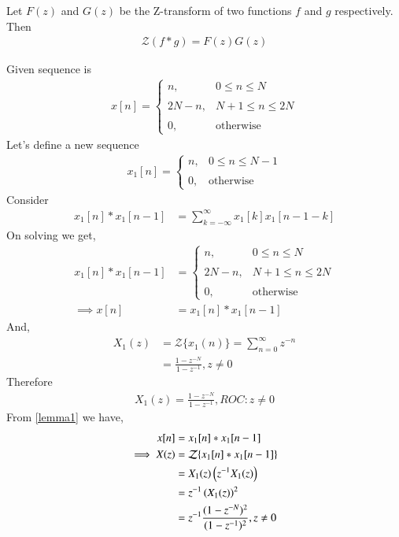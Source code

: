 \documentclass[journal,12pt,twocolumn]{IEEEtran}
\begin{document}
\begin{theorem} \label{ct}
Let $F(z)$ and $G(z)$ be the Z-transform of two functions $f$ and $g$ respectively. Then
\begin{align}
\mathcal{Z}(f * g)=F(z)G(z)
\end{align}
\end{theorem}
Given sequence is
\begin{align}
   x[n] = \begin{cases}
         n, & 0 \leq n \leq N \\~\\[-1em]
	     2N-n, & N+1 \leq n \leq 2N \\~\\[-1em]
	     0, & \text{otherwise}
         \end{cases}
\end{align}
%
Let's define a new sequence 
\begin{align}
    x_1[n] = \begin{cases}
         n, & 0 \leq n \leq N-1 \\~\\[-1em]
	     0, & \text{otherwise}
         \end{cases}
\end{align}
Consider
\begin{align}
    x_1[n]*x_1[n-1]
    &= \sum_{k = -\infty}^{\infty} x_1[k]x_1[n-1-k]
\end{align}
On solving we get,
\begin{align}
    x_1[n]*x_1[n-1] &= \begin{cases}
         n, & 0 \leq n \leq N \\~\\[-1em]
	     2N-n, & N+1 \leq n \leq 2N \\~\\[-1em]
	     0, & \text{otherwise}
         \end{cases}\\
    \implies x[n] &= x_1[n]*x_1[n-1] \label{lemma1} 
\end{align}
And,
\begin{align}
    X_1(z) &= \mathcal{Z}\{x_1(n)\} 
    = \sum_{n=0}^\infty z^{-n}\\
    &= \frac{1-z^{-N}}{1-z^{-1}}, z \neq 0
\end{align}
Therefore 
\begin{align}
        X_1(z) = \frac{1-z^{-N}}{1-z^{-1}}, ROC: z \neq 0
\end{align}
From \eqref{lemma1} we have,
\begin{align}
    x[n] &= x_1[n]*x_1[n-1]\\
     \implies X(z) &= \mathcal{Z}\{x_1[n]*x_1[n-1]\}\\
     &= X_1(z)\left(z^{-1}X_1(z)\right)\\
     &= z^{-1}\left(X_1(z)\right)^2\\
     &= z^{-1}\frac{(1-z^{-N})^2}{(1-z^{-1})^2}, z \neq 0
\end{align}
\end{document}
